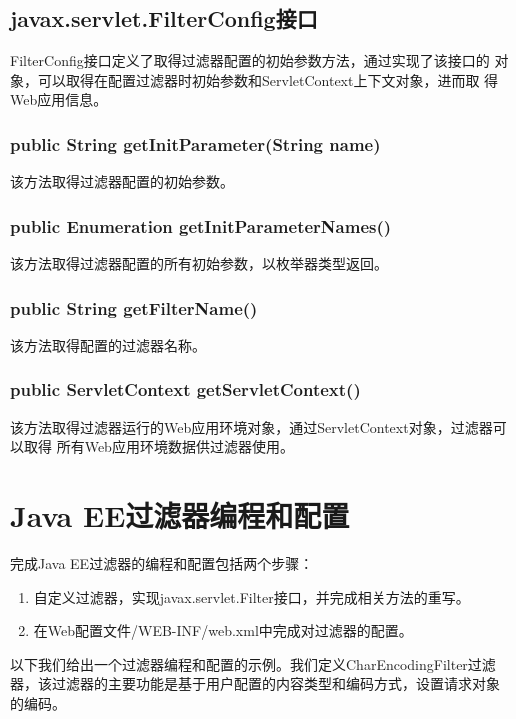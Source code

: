 \subsection{javax.servlet.FilterConfig接口} 

FilterConfig接口定义了取得过滤器配置的初始参数方法，通过实现了该接口的
对象，可以取得在配置过滤器时初始参数和ServletContext上下文对象，进而取
得Web应用信息。

\subsubsection{public String getInitParameter(String name)}

该方法取得过滤器配置的初始参数。

\subsubsection{public Enumeration getInitParameterNames()}

该方法取得过滤器配置的所有初始参数，以枚举器类型返回。

\subsubsection{public String getFilterName()}

该方法取得配置的过滤器名称。

\subsubsection{public ServletContext getServletContext()}

该方法取得过滤器运行的Web应用环境对象，通过ServletContext对象，过滤器可以取得
所有Web应用环境数据供过滤器使用。

\section{Java EE过滤器编程和配置}

完成Java EE过滤器的编程和配置包括两个步骤：

\begin{enumerate}
\item 自定义过滤器，实现javax.servlet.Filter接口，并完成相关方法的重写。
\item 在Web配置文件/WEB-INF/web.xml中完成对过滤器的配置。
\end{enumerate}

以下我们给出一个过滤器编程和配置的示例。我们定义CharEncodingFilter过滤
器，该过滤器的主要功能是基于用户配置的内容类型和编码方式，设置请求对象
的编码。

